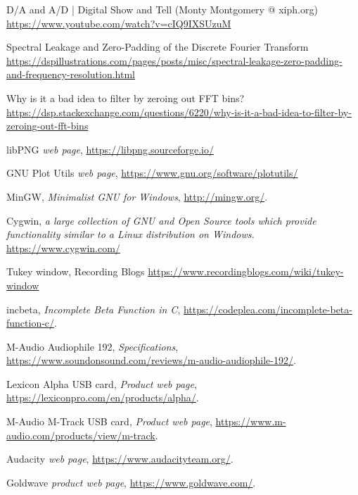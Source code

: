 \documentclass[10pt,a4paper]{report}
\begin{document}
\begin{thebibliography}{9}
	D/A and A/D | Digital Show and Tell (Monty Montgomery @ xiph.org)
	\url{https://www.youtube.com/watch?v=cIQ9IXSUzuM}
	
	Spectral Leakage and Zero-Padding of the Discrete Fourier Transform
	\url{https://dspillustrations.com/pages/posts/misc/spectral-leakage-zero-padding-and-frequency-resolution.html}
	
	Why is it a bad idea to filter by zeroing out FFT bins?
	\url{https://dsp.stackexchange.com/questions/6220/why-is-it-a-bad-idea-to-filter-by-zeroing-out-fft-bins}
	
	libPNG
	\textit{web page},
	\url{https://libpng.sourceforge.io/}
	
	GNU Plot Utils
	\textit{web page},
	\url{https://www.gnu.org/software/plotutils/}
	
	MinGW, 
	\textit{Minimalist GNU for Windows},
	\url{http://mingw.org/}.
	
	Cygwin,
	\textit{a large collection of GNU and Open Source tools which provide functionality similar to a Linux distribution on Windows.}
	\url{https://www.cygwin.com/}
	
	Tukey window, Recording Blogs
	\url{https://www.recordingblogs.com/wiki/tukey-window}
	
	incbeta, 
	\textit{Incomplete Beta Function in C},
	\url{https://codeplea.com/incomplete-beta-function-c/}.
	
	M-Audio Audiophile 192,
	\textit{Specifications},
	\url{https://www.soundonsound.com/reviews/m-audio-audiophile-192/}.
	
	Lexicon Alpha USB card,
	\textit{Product web page},
	\url{https://lexiconpro.com/en/products/alpha/}.
	
	M-Audio M-Track USB card,
	\textit{Product web page},
	\url{	https://www.m-audio.com/products/view/m-track}.
	
	Audacity
	\textit{web page},
	\url{https://www.audacityteam.org/}.
	
	Goldwave
	\textit{product web page},
	\url{https://www.goldwave.com/}.
	
\end{thebibliography}

\printglossaries
\end{document}
